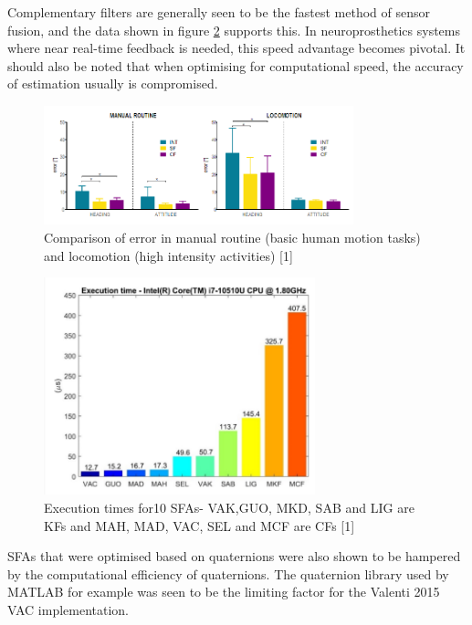 \documentclass[10pt]{report}
\begin{document}
Complementary filters are generally seen to be the fastest method of sensor fusion, and the data shown in figure \ref{fig:exec} supports this. In neuroprosthetics systems where near real-time feedback is needed, this speed advantage becomes pivotal. It should also be noted that when optimising for computational speed, the accuracy of estimation usually is compromised.

\begin{figure}[!h]
  \caption{Comparison of error in manual routine (basic human motion tasks) and locomotion (high intensity activities) [1]}
  \centering
  \label{fig:locom}
  \includegraphics[width=0.8\textwidth]{routinevslocomotion.PNG}
\end{figure}

\newpage

\begin{figure}[!h]
  \caption{Execution times for10 SFAs- VAK,GUO, MKD, SAB and LIG are KFs and MAH, MAD, VAC, SEL and MCF are CFs [1]}
  \centering
  \label{fig:exec}
  \includegraphics[width=0.7\textwidth]{exec.png}
\end{figure}

SFAs that were optimised based on quaternions were also shown to be hampered by the computational efficiency of quaternions. The quaternion library used by MATLAB for example was seen to be the limiting factor for the Valenti 2015 VAC implementation.
\end{document}
